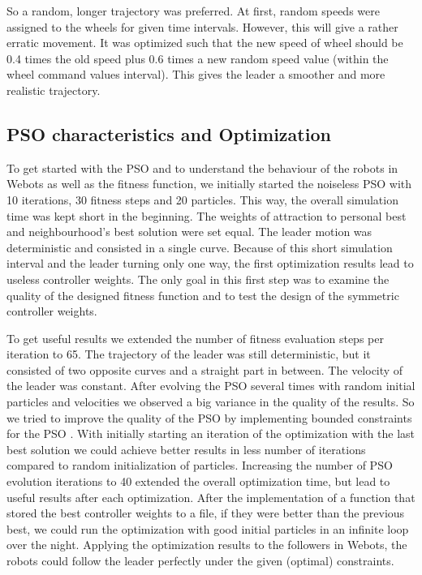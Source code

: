 \documentclass[a4paper, 10pt, conference]{ieeeconf}      %
\begin{document}
So a random, longer trajectory was preferred. At first, random speeds were assigned to the wheels for given time intervals. However, this will give a rather erratic movement. It was optimized such that the new speed of wheel should be 0.4 times the old speed plus 0.6 times a new random speed value (within the wheel command values interval). This gives the leader a smoother and more realistic trajectory.

\subsection{PSO characteristics and Optimization}

To get started with the PSO and to understand the behaviour of the robots in Webots as well as the fitness function, we initially started the noiseless PSO with 10 iterations, 30 fitness steps and 20 particles. This way, the overall simulation time was kept short in the beginning. The weights of attraction to personal best and neighbourhood's best solution were set equal. The leader motion was deterministic and consisted in a single curve.  Because of this short simulation interval and the leader turning only one way, the first optimization results lead to useless controller weights. The only goal in this first step was to examine the quality of the designed fitness function and to test the design of the symmetric controller weights.

To get useful results we extended the number of fitness evaluation steps per iteration to 65. The trajectory of the leader was still deterministic, but it consisted of two opposite curves and a straight part in between. The velocity of the leader was constant. After evolving the PSO several times with random initial particles and velocities we observed a big variance in the quality of the results. So we tried to improve the quality of the PSO by implementing bounded constraints for the PSO \cite{c1}. With initially starting an iteration of the optimization with the last best solution we could achieve better results in less number of iterations compared to random initialization of particles. Increasing the number of PSO evolution iterations to 40 extended the overall optimization time, but lead to useful results after each optimization. After the implementation of a function that stored the best controller weights to a file, if they were better than the previous best, we could run the optimization with good initial particles in an infinite loop over the night. Applying the optimization results to the followers in Webots, the robots could follow the leader perfectly under the given (optimal) constraints.
\end{document}
